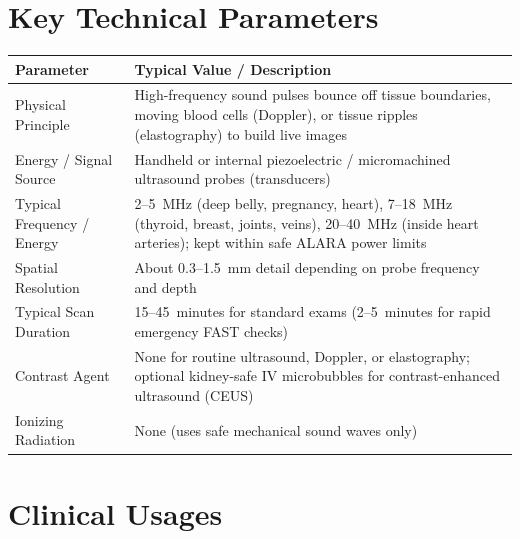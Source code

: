 \section{Key Technical Parameters}
\noindent
\begin{tabularx}{\textwidth}{@{}l X@{}}
\toprule
\textbf{Parameter} & \textbf{Typical Value / Description} \\
\midrule
Physical Principle & High-frequency sound pulses bounce off tissue boundaries, moving blood cells (Doppler), or tissue ripples (elastography) to build live images \\
Energy / Signal Source & Handheld or internal piezoelectric / micromachined ultrasound probes (transducers) \\
Typical Frequency / Energy & 2--5~MHz (deep belly, pregnancy, heart), 7--18~MHz (thyroid, breast, joints, veins), 20--40~MHz (inside heart arteries); kept within safe ALARA power limits \\
Spatial Resolution & About 0.3--1.5~mm detail depending on probe frequency and depth \\
Typical Scan Duration & 15--45~minutes for standard exams (2--5~minutes for rapid emergency FAST checks) \\
Contrast Agent & None for routine ultrasound, Doppler, or elastography; optional kidney-safe IV microbubbles for contrast-enhanced ultrasound (CEUS) \\
Ionizing Radiation & None (uses safe mechanical sound waves only) \\
\bottomrule
\end{tabularx}

\section{Clinical Usages}

